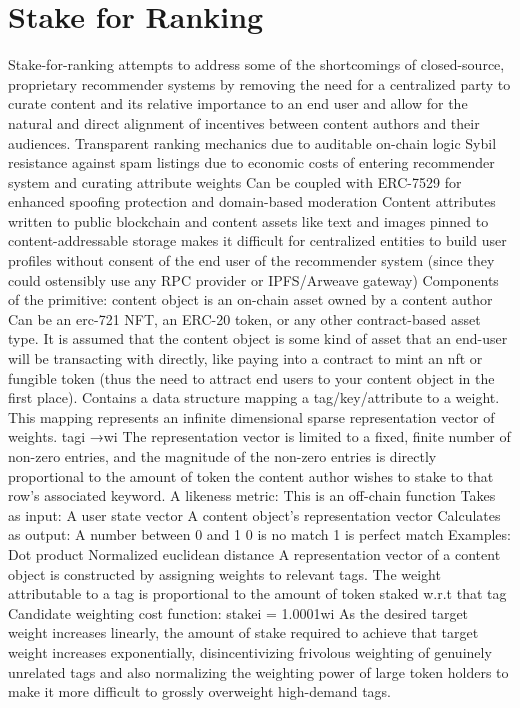 \section{Stake for Ranking} 
\label{section:ProtocolDescription}

Stake-for-ranking attempts to address some of the shortcomings of closed-source, proprietary recommender systems by removing the need for a centralized party to curate content and its relative importance to an end user and allow for the natural and direct alignment of incentives between content authors and their audiences. 
Transparent ranking mechanics due to auditable on-chain logic
Sybil resistance against spam listings due to economic costs of entering recommender system and curating attribute weights
Can be coupled with ERC-7529 for enhanced spoofing protection and domain-based moderation
Content attributes written to public blockchain and content assets like text and images pinned to content-addressable storage makes it difficult for centralized entities to build user profiles without consent of the end user of the recommender system (since they could ostensibly use any RPC provider or IPFS/Arweave gateway)
Components of the primitive:
content object is an on-chain asset owned by a content author
Can be an erc-721 NFT, an ERC-20 token, or any other contract-based asset type. It is assumed that the content object is some kind of asset that an end-user will be transacting with directly, like paying into a contract to mint an nft or fungible token (thus the need to attract end users to your content object in the first place). 
Contains a data structure mapping a tag/key/attribute to a weight. This mapping represents an infinite dimensional sparse representation vector of weights. tagi →wi
The representation vector is limited to a fixed, finite number of non-zero entries, and the magnitude of the non-zero entries is directly proportional to the amount of token the content author wishes to stake to that row’s associated keyword.
A likeness metric:
This is an off-chain function
Takes as input:
A user state vector
A content object’s representation vector
Calculates as output:
A number between 0 and 1
0 is no match
1 is perfect match
Examples:
Dot product
Normalized euclidean distance
A representation vector of a content object is constructed by assigning weights to relevant tags. 
The weight attributable to a tag is proportional to the amount of token staked w.r.t that tag
Candidate weighting cost function: stakei = 1.0001wi  
As the desired target weight increases linearly, the amount of stake required to achieve that target weight increases exponentially, disincentivizing frivolous weighting of genuinely unrelated tags and also normalizing the weighting power of large token holders to make it more difficult to grossly overweight high-demand tags. 
